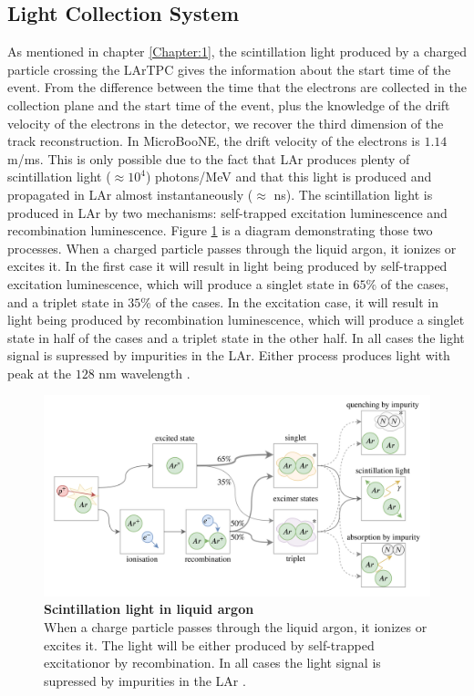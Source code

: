\subsection{Light Collection System}
%
As mentioned in chapter \ref{Chapter:1}, the scintillation light produced by a charged particle crossing the LArTPC gives the information about the start time of the event. From the difference between the time that the electrons are collected in the collection plane and the start time of the event, plus the knowledge of the drift velocity of the electrons in the detector, we recover the third dimension of the track reconstruction. In MicroBooNE, the drift velocity of the electrons is $1.14$ m/ms. 
%
This is only possible due to the fact that LAr produces plenty of scintillation light ($\approx 10^4 $) photons/MeV and that this light is produced and propagated in LAr almost instantaneously ($\approx$ ns). The scintillation light is produced in LAr by two mechanisms: self-trapped excitation luminescence and recombination luminescence. Figure \ref{lar_excimers} is a diagram demonstrating those two processes. When a charged particle passes through the liquid argon, it ionizes or excites it. In the first case it will result in light being produced by self-trapped excitation luminescence, which will produce a singlet state in $65\%$ of the cases, and a triplet state in $35\%$ of the cases. In the excitation case, it will result in light being produced by recombination luminescence, which will produce a singlet state in half of the cases and a triplet state in the other half. In all cases the light signal is supressed by impurities in the LAr. Either process produces light with peak at the $128$ nm wavelength \cite{lar_excimers}.
%
\begin{figure}[h!]
    \begin{center}
        \includegraphics[scale=0.35]{Figures/lar_excimers.png}
        \caption[Scintillation light in liquid argon]{{\textbf{Scintillation light in liquid argon}} \\When a charge particle passes through the liquid argon, it ionizes or excites it. The light will be either produced by self-trapped excitationor by recombination. In all cases the light signal is supressed by impurities in the LAr \cite{lar_excimers}.}
        \label{lar_excimers} 
    \end{center}
\end{figure}
